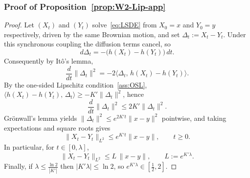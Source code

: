 \documentclass[11pt,a4paper,reqno]{amsart}
\theoremstyle{plain}
\theoremstyle{definition}
\theoremstyle{remark}
\begin{document}
\subsubsection{Proof of Proposition~\ref{prop:W2-Lip-app}}
\label{proof:W2-Lip-app}
\begin{proof}
Let $(X_t)$ and $(Y_t)$ solve~\eqref{eq:LSDE} from $X_0=x$ and $Y_0=y$
respectively, driven by the same Brownian motion, and set $\Delta_t:=X_t-Y_t$.
Under this synchronous coupling the diffusion terms cancel, so
\[
  d\Delta_t=-\bigl(h(X_t)-h(Y_t)\bigr)\,dt.
\]
Consequently by It\^o's lemma,
\[
  \frac{d}{dt}\|\Delta_t\|^2
  =-2\bigl\langle \Delta_t,\,h(X_t)-h(Y_t)\bigr\rangle.
\]
By the one-sided Lipschitz condition~\ref{ass:OSL},
$\langle h(X_t)-h(Y_t),\,\Delta_t\rangle\ge -K'\|\Delta_t\|^2$, hence
\[
  \frac{d}{dt}\|\Delta_t\|^2
  \le 2K'\|\Delta_t\|^2.
\]
Grönwall's lemma yields $\|\Delta_t\|^2\le e^{2K't}\|x-y\|^2$ pointwise, and
taking expectations and square roots gives
\[
  \|X_t-Y_t\|_{L^2}\le e^{K't}\|x-y\|,
  \qquad t\ge 0.
\]
In particular, for $t\in[0,\lambda]$,
\[
  \|X_t-Y_t\|_{L^2}\le L\,\|x-y\|,
  \qquad L:=e^{K'\lambda}.
\]
Finally, if $\lambda\le\frac{\ln 2}{|K'|}$ then $|K'\lambda|\le\ln 2$, so
$e^{K'\lambda}\in[\tfrac12,2]$.
\end{proof}
\end{document}
